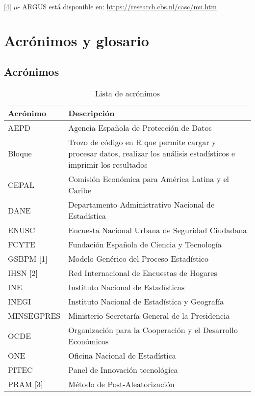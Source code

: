 \documentclass[
]{book}
\theoremstyle{definition}
\theoremstyle{definition}
\theoremstyle{definition}
\theoremstyle{definition}
\theoremstyle{remark}
\begin{document}
\protect\hyperlink{_ftnref4}{{[}4{]}} \(\mu\)- ARGUS está disponible en: \url{https://research.cbs.nl/casc/mu.htm}

\hypertarget{acruxf3nimos-y-glosario}{%
\chapter{Acrónimos y glosario}\label{acruxf3nimos-y-glosario}}

\hypertarget{acruxf3nimos}{%
\section{Acrónimos}\label{acruxf3nimos}}

\begin{table}

\caption{\label{tab:tabAcron1}Lista de acrónimos}
\centering
\begin{tabular}[t]{l|l}
\hline
Acrónimo & Descripción\\
\hline
AEPD & Agencia Española de Protección de Datos\\
\hline
Bloque & Trozo de código en R que permite cargar y procesar datos, realizar los análisis estadísticos e imprimir los resultados\\
\hline
CEPAL & Comisión Económica para América Latina y el Caribe\\
\hline
DANE & Departamento Administrativo Nacional de Estadística\\
\hline
ENUSC & Encuesta Nacional Urbana de Seguridad Ciudadana\\
\hline
FCYTE & Fundación Española de Ciencia y Tecnología\\
\hline
GSBPM [1] & Modelo Genérico del Proceso Estadístico\\
\hline
IHSN [2] & Red Internacional de Encuestas de Hogares\\
\hline
INE & Instituto Nacional de Estadísticas\\
\hline
INEGI & Instituto Nacional de Estadística y Geografía\\
\hline
MINSEGPRES & Ministerio Secretaría General de la Presidencia\\
\hline
OCDE & Organización para la Cooperación y el Desarrollo Económicos\\
\hline
ONE & Oficina Nacional de Estadística\\
\hline
PITEC & Panel de Innovación tecnológica\\
\hline
PRAM [3] & Método de Post-Aleatorización\\

\end{tabular}
\end{table}
\end{document}
